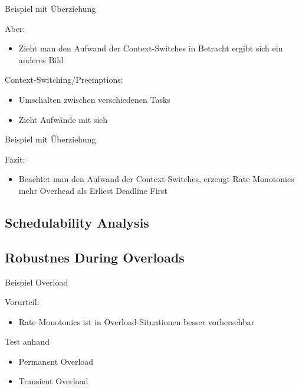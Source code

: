 \begin{frame}{\subsecname}
	Beispiel mit Überziehung%
\end{frame}

\begin{frame}{\subsecname}
	Aber:\pause
	\begin{itemize}
		\item Zieht man den Aufwand der Context-Switches in Betracht ergibt sich ein anderes Bild
	\end{itemize}
\end{frame}

\begin{frame}{\subsecname}
	Context-Switching/Preemptions:
	\begin{itemize}
		\item Umschalten zwischen verschiedenen Tasks
		\item Zieht Aufwände mit sich
	\end{itemize}
\end{frame}

\begin{frame}{\subsecname}
	Beispiel mit Überziehung%
\end{frame}

\begin{frame}{\subsecname}
	Fazit:
	\begin{itemize}
		\item Beachtet man den Aufwand der Context-Switches, erzeugt Rate Monotonics mehr Overhead als Erliest Deadline First
	\end{itemize}
\end{frame}

\subsection{Schedulability Analysis}
\begin{frame}{\subsecname}
\end{frame}

\subsection{Robustnes During Overloads}

\begin{frame}{\subsecname}
	Beispiel Overload
\end{frame}

\begin{frame}{\subsecname}
	Vorurteil:
	\begin{itemize}
		\item Rate Monotonics ist in Overload-Situationen besser vorhersehbar
	\end{itemize}$ $\\\pause
	Test anhand
	\begin{itemize}
		\item Permanent Overload
		\item Transient Overload
	\end{itemize}
\end{frame}

